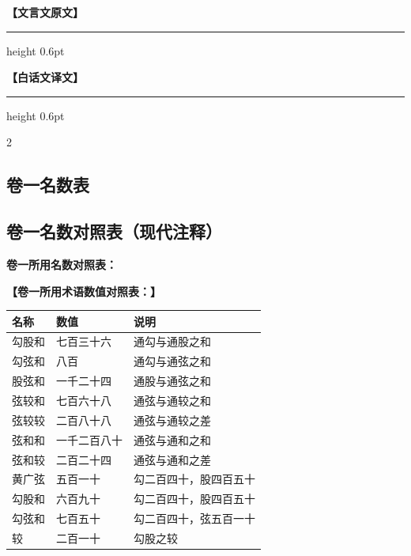 \documentclass[11pt,a4paper]{article}
\newcommand{\colheaders}{%
  \noindent\begin{minipage}[t]{0.48\textwidth}\centering
    \textbf{\color{classicalframe}【文言文原文】}
    \vspace{0.3em}
    \hrule height 0.6pt
  \end{minipage}%
  \hfill
  \begin{minipage}[t]{0.48\textwidth}\centering
    \textbf{\color{modernframe}【白话文译文】}
    \vspace{0.3em}
    \hrule height 0.6pt
  \end{minipage}
  \par\medskip
}
\begin{document}
\clearpage
\colheaders
\begin{paracol}{2}

\subsection*{卷一名数表}

\switchcolumn
\subsection*{卷一名数对照表（现代注释）}

\switchcolumn*

\noindent
\textbf{卷一所用名数对照表：}

\switchcolumn
\noindent
\textbf{【卷一所用术语数值对照表：】}

\switchcolumn*

\begin{center}
\begin{tabular}{|l|l|l|}
\hline
\textbf{名称} & \textbf{数值} & \textbf{说明} \\
\hline
勾股和 & 七百三十六 & 通勾与通股之和 \\
\hline
勾弦和 & 八百 & 通勾与通弦之和 \\
\hline
股弦和 & 一千二十四 & 通股与通弦之和 \\
\hline
弦较和 & 七百六十八 & 通弦与通较之和 \\
\hline
弦较较 & 二百八十八 & 通弦与通较之差 \\
\hline
弦和和 & 一千二百八十 & 通弦与通和之和 \\
\hline
弦和较 & 二百二十四 & 通弦与通和之差 \\
\hline
黄广弦 & 五百一十 & 勾二百四十，股四百五十 \\
\hline
勾股和 & 六百九十 & 勾二百四十，股四百五十 \\
\hline
勾弦和 & 七百五十 & 勾二百四十，弦五百一十 \\
\hline
较 & 二百一十 & 勾股之较 \\
\hline
\end{tabular}
\end{center}

\switchcolumn


\end{paracol}
\end{document}
